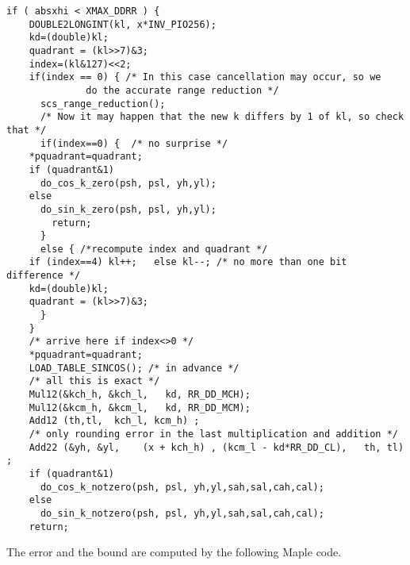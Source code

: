 \begin{lstlisting}[caption={Cody and Waite argument reduction in
    double-double},firstnumber=1]
  if ( absxhi < XMAX_DDRR ) {
    DOUBLE2LONGINT(kl, x*INV_PIO256);
    kd=(double)kl;
    quadrant = (kl>>7)&3;
    index=(kl&127)<<2;
    if(index == 0) { /* In this case cancellation may occur, so we
			  do the accurate range reduction */
      scs_range_reduction(); 
      /* Now it may happen that the new k differs by 1 of kl, so check that */
      if(index==0) {  /* no surprise */
	*pquadrant=quadrant;
	if (quadrant&1)
	  do_cos_k_zero(psh, psl, yh,yl);
	else 
	  do_sin_k_zero(psh, psl, yh,yl);
      	return;
      }
      else { /*recompute index and quadrant */
	if (index==4) kl++;   else kl--; /* no more than one bit difference */
	kd=(double)kl;
	quadrant = (kl>>7)&3;
      }
    }
    /* arrive here if index<>0 */
    *pquadrant=quadrant;
    LOAD_TABLE_SINCOS(); /* in advance */
    /* all this is exact */
    Mul12(&kch_h, &kch_l,   kd, RR_DD_MCH);
    Mul12(&kcm_h, &kcm_l,   kd, RR_DD_MCM);
    Add12 (th,tl,  kch_l, kcm_h) ;
    /* only rounding error in the last multiplication and addition */ 
    Add22 (&yh, &yl,    (x + kch_h) , (kcm_l - kd*RR_DD_CL),   th, tl) ;
    if (quadrant&1)
      do_cos_k_notzero(psh, psl, yh,yl,sah,sal,cah,cal);
    else 
      do_sin_k_notzero(psh, psl, yh,yl,sah,sal,cah,cal);
    return;
\end{lstlisting}


The error and the bound are computed by the following Maple code.

